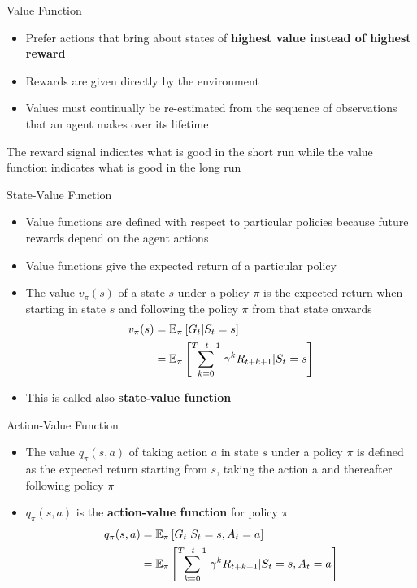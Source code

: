 \documentclass[11pt]{beamer}
\begin{document}
\begin{frame}{Value Function}
	\begin{itemize}
		\item Prefer actions that bring about states of \textbf{highest value instead of highest reward}
		\item Rewards are given directly by the environment
		\item Values must continually be re-estimated from the sequence of observations that an agent makes over its lifetime
	\end{itemize}
	\begin{tcolorbox}
	The reward signal indicates what is good in the short run while the value function indicates what is good in the long run
	\end{tcolorbox}
\end{frame}
\begin{frame}{State-Value Function}
	\begin{itemize}
		\item Value functions are defined with respect to particular policies because future rewards depend on the agent actions
		\item Value functions give the expected return of a particular policy
		\item The value $v_\pi(s)$ of a state $s$ under a policy $\pi$ is the expected return when starting in state $s$ and following the policy $\pi$ from that state onwards
		\begin{align}v_\pi(s) &= \mathbb{E}_\pi \left[G_t \vert S_t=s \right]\notag\\ &= \mathbb{E}_\pi \left[\sum\limits_{k=0}^{T-t-1}\, \gamma^k R_{t+k+1} \vert S_t=s \right]
		\end{align}
\item This is called also \textbf{state-value function}
	\end{itemize}
\end{frame}
\begin{frame}{Action-Value Function}
	\begin{itemize}
		\item The value $q_\pi(s, a)$ of taking action $a$ in state $s$ under a policy $\pi$  is defined as the expected return starting from $s$, taking the action a and thereafter following policy $\pi$ 
		\item $q_\pi(s,a)$ is the \textbf{action-value function} for policy $\pi$ \begin{align}q_\pi(s,a) &= \mathbb{E}_\pi \left[G_t \vert S_t=s, A_t=a \right]\notag\\ &= \mathbb{E}_\pi \left[\sum\limits_{k=0}^{T-t-1}\, \gamma^k R_{t+k+1} \vert S_t=s , A_t=a \right]
		\end{align}
	\end{itemize}
\end{frame}
\end{document}
